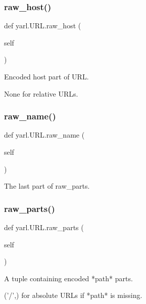 \subsubsection{\texorpdfstring{raw\+\_\+host()}{raw\_host()}}
{\footnotesize\ttfamily def yarl.\+U\+R\+L.\+raw\+\_\+host (\begin{DoxyParamCaption}\item[{}]{self }\end{DoxyParamCaption})}

\begin{DoxyVerb}Encoded host part of URL.

None for relative URLs.\end{DoxyVerb}
 \mbox{\label{classyarl_1_1_u_r_l_ad42c3ff9c5d78c63bf0701e7a59e3666}} 
\subsubsection{\texorpdfstring{raw\+\_\+name()}{raw\_name()}}
{\footnotesize\ttfamily def yarl.\+U\+R\+L.\+raw\+\_\+name (\begin{DoxyParamCaption}\item[{}]{self }\end{DoxyParamCaption})}

\begin{DoxyVerb}The last part of raw_parts.\end{DoxyVerb}
 \mbox{\label{classyarl_1_1_u_r_l_a9fcc938e6c9cef3442d2087945ee8e61}} 
\subsubsection{\texorpdfstring{raw\+\_\+parts()}{raw\_parts()}}
{\footnotesize\ttfamily def yarl.\+U\+R\+L.\+raw\+\_\+parts (\begin{DoxyParamCaption}\item[{}]{self }\end{DoxyParamCaption})}

\begin{DoxyVerb}A tuple containing encoded *path* parts.

('/',) for absolute URLs if *path* is missing.\end{DoxyVerb}
 \mbox{\label{classyarl_1_1_u_r_l_a1391b195c4999384e89b4f399a20b978}} 
